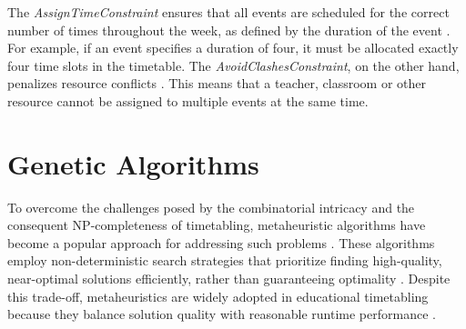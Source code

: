 \documentclass[english,examples]{isasthesis}
\begin{document}
The \textit{AssignTimeConstraint} ensures that all events are scheduled
for the correct number of times throughout the week, as defined by the duration
of the event \cite{xhsttDocs}.
For example, if an event specifies a duration of four, it must be allocated
exactly four time slots in the timetable.
The \textit{AvoidClashesConstraint}, on the other hand, penalizes resource
conflicts \cite{xhsttTwenteWeb}.
This means that a teacher, classroom or other resource cannot be assigned to
multiple events at the same time.



\section{Genetic Algorithms}
To overcome the challenges posed by the combinatorial intricacy and the
consequent NP-completeness of timetabling, metaheuristic algorithms
have become a popular approach for addressing such problems
\cite{da2016goal}.
These algorithms employ non-deterministic search strategies that prioritize
finding high-quality, near-optimal solutions efficiently, rather than
guaranteeing optimality \cite{goldberg1989}.
Despite this trade-off, metaheuristics are widely adopted in educational
timetabling because they balance solution quality with reasonable runtime
performance \cite{Tan2021,Ceschia2023}.
\end{document}
